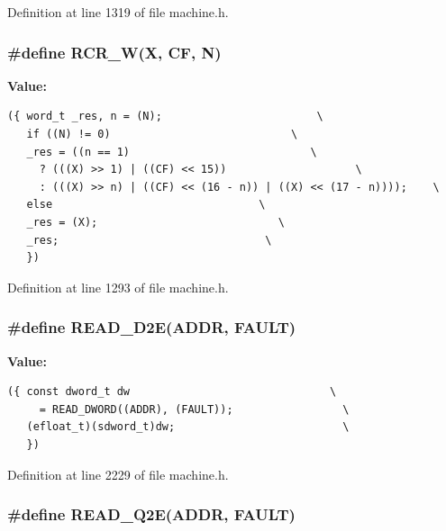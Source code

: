 Definition at line 1319 of file machine.h.
\subsubsection[{RCR\_\-W}]{\setlength{\rightskip}{0pt plus 5cm}\#define RCR\_\-W(X, \/  CF, \/  N)}\label{machine_8h_83f526d0dbaa367ad9bca14561dfee40}


\textbf{Value:}

\begin{Code}\begin{verbatim}({ word_t _res, n = (N);                        \
   if ((N) != 0)                            \
   _res = ((n == 1)                            \
     ? (((X) >> 1) | ((CF) << 15))                    \
     : (((X) >> n) | ((CF) << (16 - n)) | ((X) << (17 - n))));    \
   else                                \
   _res = (X);                            \
   _res;                                \
   })
\end{verbatim}
\end{Code}


Definition at line 1293 of file machine.h.
\subsubsection[{READ\_\-D2E}]{\setlength{\rightskip}{0pt plus 5cm}\#define READ\_\-D2E(ADDR, \/  FAULT)}\label{machine_8h_5db0eae0e78d9a03f04f6d3d6d6bdf86}


\textbf{Value:}

\begin{Code}\begin{verbatim}({ const dword_t dw                               \
     = READ_DWORD((ADDR), (FAULT));                 \
   (efloat_t)(sdword_t)dw;                          \
   })
\end{verbatim}
\end{Code}


Definition at line 2229 of file machine.h.
\subsubsection[{READ\_\-Q2E}]{\setlength{\rightskip}{0pt plus 5cm}\#define READ\_\-Q2E(ADDR, \/  FAULT)}\label{machine_8h_fdf9ae088b2664a5a12acaf866877d2d}


